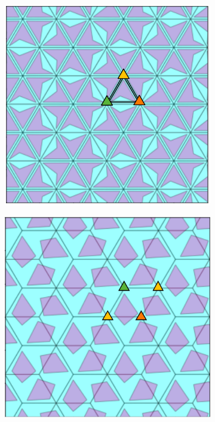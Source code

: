 \documentclass[12pt]{article}
\begin{document}
\begin{figure}[H]

  \begin{subfigure}[b]{0.32\textwidth}
    \includegraphics[width=.9\textwidth]{skicap3m1.png}
    \label{fig:f4}
  \end{subfigure}
  \begin{subfigure}[b]{0.32\textwidth}
    \includegraphics[width=.9\textwidth]{skicap3.png}
    \label{fig:f5}

\end{subfigure}
\end{figure}
\end{document}
